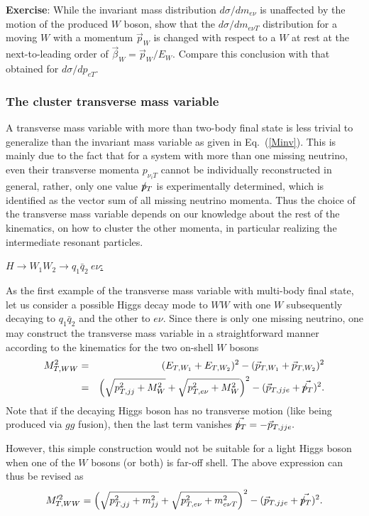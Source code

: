 \documentclass[12pt,prd,aps,floats,preprintnumbers,preprint,superscriptaddress,floatfix,nofootinbib]{revtex4}
\newcommand{ \slashchar }[1]{\setbox0=\hbox{$#1$}   %
   \dimen0=\wd0                                     %
   \setbox1=\hbox{/} \dimen1=\wd1                   %
   \ifdim\dimen0>\dimen1                            %
      \rlap{\hbox to \dimen0{\hfil/\hfil}}          %
      #1                                            %
   \else                                            %
      \rlap{\hbox to \dimen1{\hfil$#1$\hfil}}       %
      /                                             %
   \fi}                                             %
\def\ptmiss{\slashchar{p}_{T}}
\def\bea{\begin{eqnarray}}
\def\eea{\end{eqnarray}}
\begin{document}
{
\vskip 0.2cm
\noindent
{\bf Exercise}: While the invariant mass distribution $d\sigma/dm_{e\nu}$ is unaffected 
 by the motion of the produced $W$ boson, show that the $d\sigma/ dm_{e\nu T}^{}$ 
 distribution for a moving $W$ with a momentum $\vec p_W^{}$ is changed with 
 respect to a $W$ at rest  at the next-to-leading order of $\vec \beta_W^{} = \vec p_W^{}/E_W$.
Compare this conclusion with that obtained for  $d\sigma/ dp_{eT}^{}$.
\vskip 0.2cm
}

\subsubsection{The cluster transverse mass variable}

A  transverse mass variable with more than two-body final state is
less trivial to generalize than the invariant mass variable 
as given in Eq.~(\ref{Minv}).  This is mainly due to the fact that for a system
with more than one missing neutrino, even their transverse 
momenta $p_{\nu_i T}$
cannot be  individually reconstructed in general,  rather,  only one value
$\ptmiss$ is experimentally determined, which is identified as the vector
sum of all missing neutrino momenta.  Thus the choice of the
transverse mass variable depends on our knowledge about
the rest of the kinematics, on how to cluster the other momenta, 
in particular realizing the intermediate resonant particles. 

\vskip 0.2cm
\noindent
\underline{$H\to W_1 W_2 \to q_1 \bar q_2\ e \nu$:}

As the first example of the transverse mass variable with multi-body
final state, let us consider a possible Higgs decay mode
to $WW$ with one $W$ subsequently decaying to $q_1 \bar q_2$ 
and the other to $e\nu$. Since there is only one missing neutrino,
one may construct the transverse mass variable in a straightforward 
manner according to the kinematics for the two on-shell $W$ bosons
%
\bea
\nonumber
 M_{T,WW}^2 &=&  (E_{T,W_1} + E_{T,W_2} )^2 - (\vec p_{T,W_1} + \vec p_{T,W_2} )^2 \\
&=& \left( \sqrt{p_{T,jj}^2 + M_W^2} + \sqrt{p_{T,e\nu}^2 + M_W^2}  \right)^2 
- (\vec p_{T,jje} + \vec{\ptmiss } )^2.
\nonumber
\eea
Note that if the decaying Higgs boson has no transverse motion (like being
produced via $gg$ fusion), then the last term vanishes $\vec{\ptmiss }=-\vec p_{T,jje}.$

However, this simple construction would not be suitable for a light Higgs boson
when one of the $W$ bosons (or both) is far-off shell. 
The above expression can thus be revised as 
\bea
 M_{T,WW}^{\prime 2} 
 = \left( \sqrt{p_{T,jj}^2 + m_{jj}^2} + \sqrt{p_{T,e\nu}^2 + m_{e\nu T}^2}  \right)^2 
- (\vec p_{T,jje} + \vec{\ptmiss } )^2.
\nonumber
\eea
\end{document}
